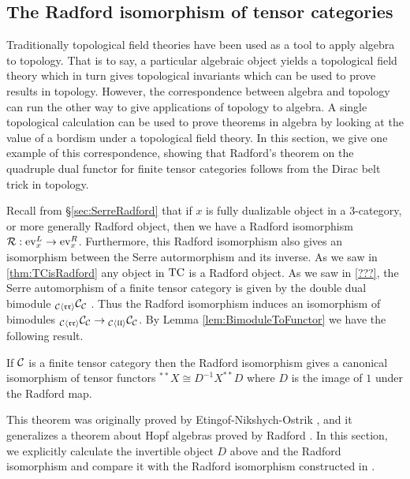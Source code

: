 \documentclass{amsart}
\begin{document}
\subsection{The Radford isomorphism of tensor categories}

Traditionally topological field theories have been used as a tool to apply algebra to topology.  That is to say, a particular algebraic object yields a topological field theory which in turn gives topological invariants which can be used to prove results in topology.  However, the correspondence between algebra and topology can run the other way to give applications of topology to algebra.  A single topological calculation can be used to prove theorems in algebra by looking at the value of a bordism under a topological field theory.  In this section, we give one example of this correspondence, showing that Radford's theorem on the quadruple dual functor for finite tensor categories follows from the Dirac belt trick in topology.

Recall from \S \ref{sec:SerreRadford} that if $x$ is fully dualizable object in a $3$-category, or more generally Radford object, then we have a Radford isomorphism $\mathcal R: \mathrm{ev}_x^L \rightarrow \mathrm{ev}_x^R$.  Furthermore, this Radford isomorphism also gives an isomorphism between the Serre autormorphism and its inverse.  As we saw in \ref{thm:TCisRadford} any object in $\mathrm{TC}$ is a Radford object.  As we saw in \ref{???}, the Serre automorphism of a finite tensor category is given by the double dual bimodule ${}_{\mathcal C \langle \mathfrak{r r} \rangle}\mathcal C_{\mathcal C}$ .  Thus the Radford isomorphism induces an isomorphism of bimodules ${}_{\mathcal C \langle \mathfrak{r r} \rangle} \mathcal C_{\mathcal C} \rightarrow {}_{\mathcal C \langle \mathfrak{l l} \rangle} \mathcal C_{\mathcal C}$.  By Lemma \ref{lem:BimoduleToFunctor} we have the following result.

\begin{theorem}
If $\mathcal C$ is a finite tensor category then the Radford isomorphism gives a canonical isomorphism of tensor functors ${}^{**}X \cong D^{-1} X^{**} D$ where $D$ is the image of $1$ under the Radford map.
\end{theorem}

This theorem was originally proved by Etingof-Nikshych-Ostrik \cite{MR2097289}, and it generalizes a theorem about Hopf algebras proved by Radford \cite{MR0407069}.  In this section, we explicitly calculate the invertible object $D$ above and the Radford isomorphism and compare it with the Radford isomorphism constructed in \cite{MR2097289}.
\end{document}
